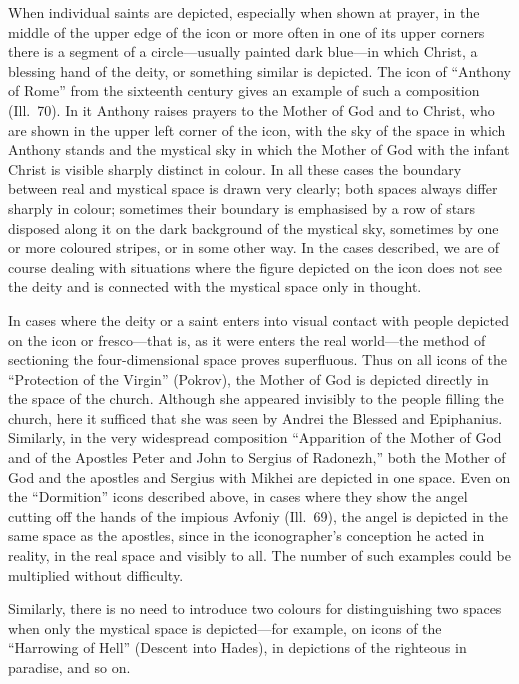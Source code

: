 When individual saints are depicted, especially when shown at prayer, in the middle of
the upper edge of the icon or more often in one of its upper corners there is a segment
of a circle---usually painted dark blue---in which Christ, a blessing hand of the deity,
or something similar is depicted.  The icon of ``Anthony of Rome'' from the sixteenth
century gives an example of such a composition (Ill.~70).  In it Anthony raises prayers
to the Mother of God and to Christ, who are shown in the upper left corner of the icon,
with the sky of the space in which Anthony stands and the mystical sky in which the
Mother of God with the infant Christ is visible sharply distinct in colour.  In all these
cases the boundary between real and mystical space is drawn very clearly; both spaces
always differ sharply in colour; sometimes their boundary is emphasised by a row of stars
disposed along it on the dark background of the mystical sky, sometimes by one or more
coloured stripes, or in some other way.  In the cases described, we are of course dealing
with situations where the figure depicted on the icon does not see the deity and is
connected with the mystical space only in thought.

In cases where the deity or a saint enters into visual contact with people depicted on
the icon or fresco---that is, as it were enters the real world---the method of sectioning
the four-dimensional space proves superfluous.  Thus on all icons of the ``Protection of
the Virgin'' (Pokrov), the Mother of God is depicted directly in the space of the church.
Although she appeared invisibly to the people filling the church, here it sufficed that
she was seen by Andrei the Blessed and Epiphanius.  Similarly, in the very widespread
composition ``Apparition of the Mother of God and of the Apostles Peter and John to
Sergius of Radonezh,'' both the Mother of God and the apostles and Sergius with Mikhei
are depicted in one space.  Even on the ``Dormition'' icons described above, in cases
where they show the angel cutting off the hands of the impious Avfoniy (Ill.~69), the
angel is depicted in the same space as the apostles, since in the iconographer's
conception he acted in reality, in the real space and visibly to all.  The number of
such examples could be multiplied without difficulty.


Similarly, there is no need to introduce two colours for distinguishing two spaces when
only the mystical space is depicted---for example, on icons of the ``Harrowing of Hell''
(Descent into Hades), in depictions of the righteous in paradise, and so on.

